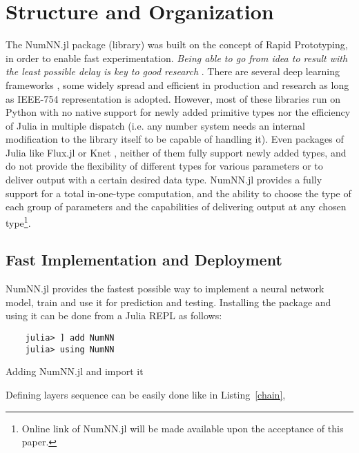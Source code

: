 \section{Structure and Organization}

The NumNN.jl  package%
 (library) was built on the concept of Rapid Prototyping, in order to enable fast experimentation. \emph{Being able to go from idea to result with the least possible delay is key to good research} \cite{Keras}. There are several deep learning frameworks \cite{Abadi2016,Collet2015,Jia2014,Paszke2017,PyTorch2019}, some widely spread and efficient in production and research as long as IEEE-754 representation is adopted. However, most of these libraries run on Python with no native support for newly added primitive types nor the efficiency of Julia in multiple dispatch (i.e. any number system needs an internal modification to the library itself to be capable of handling it). Even packages of Julia like Flux.jl \cite{Flux.jl-2018,Innes2018} or Knet \cite{Yuret2016k}, neither of them fully support newly added types, and do not provide the flexibility of different types for various parameters or to deliver output with a certain desired data type. NumNN.jl provides a fully support for a total in-one-type computation, and the ability to choose the type of each group of parameters and the capabilities of delivering output at any chosen type\footnote{Online link of NumNN.jl will be made available upon the acceptance  of this paper.}.

\subsection{Fast Implementation and Deployment}

NumNN.jl provides the fastest possible way to implement a neural network model, train and use it for prediction and testing. Installing the package and using it can be done from a Julia REPL as follows:

\begin{listing}[H]
	\begin{verbatim}
	julia> ] add NumNN
	julia> using NumNN
	\end{verbatim}
	\caption{Adding NumNN.jl and import it}\label{addimport}
\end{listing}

Defining layers sequence can be easily done like in Listing~\ref{chain},

